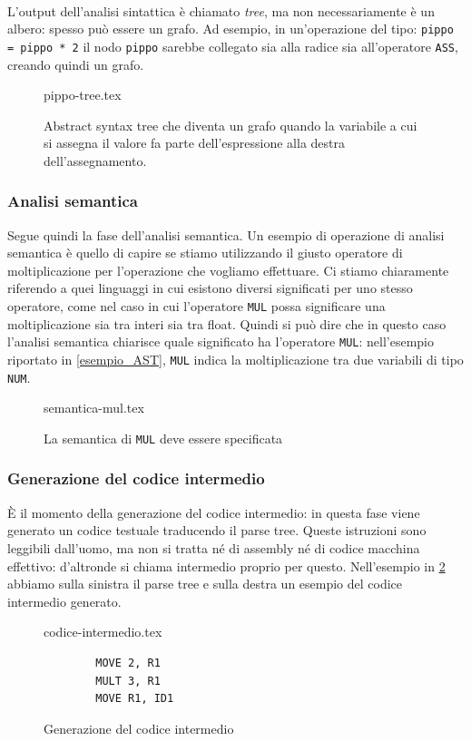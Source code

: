 \documentclass[class=book, crop=false, oneside, 12pt]{standalone}
\begin{document}
\paragraph{}
L’output dell’analisi sintattica è chiamato \emph{tree}, ma non necessariamente è un albero: spesso può essere un grafo. Ad esempio, in un’operazione del tipo:
\texttt{pippo = pippo * 2}
il nodo \texttt{pippo} sarebbe collegato sia alla radice sia all’operatore \texttt{ASS}, creando quindi un grafo.
\begin{figure}[H]
	\centering
	{pippo-tree.tex}
	\caption{Abstract syntax tree che diventa un grafo quando la variabile a cui si assegna il valore fa parte dell'espressione alla destra dell'assegnamento.}
	\label{esempio_pippo}
\end{figure}

\subsubsection{Analisi semantica}
Segue quindi la fase dell’analisi semantica. Un esempio di operazione di analisi semantica è quello di capire se stiamo utilizzando il giusto operatore di moltiplicazione per l’operazione che vogliamo effettuare. Ci stiamo chiaramente riferendo a quei linguaggi in cui esistono diversi significati per uno stesso operatore, come nel caso in cui l'operatore \texttt{MUL} possa significare una moltiplicazione sia tra interi sia tra float. Quindi si può dire che in questo caso l’analisi semantica chiarisce quale significato ha l’operatore \texttt{MUL}: nell’esempio riportato in \ref{esempio_AST}, \texttt{MUL} indica la moltiplicazione tra due variabili di tipo \texttt{NUM}.
\begin{figure}[H]
	\centering
	{semantica-mul.tex}
	\caption{La semantica di \texttt{MUL} deve essere specificata}
\end{figure}

\subsubsection{Generazione del codice intermedio}
È il momento della generazione del codice intermedio: in questa fase viene generato un codice testuale traducendo il parse tree. Queste istruzioni sono leggibili dall’uomo, ma non si tratta né di assembly né di codice macchina effettivo: d'altronde si chiama intermedio proprio per questo. Nell'esempio in \ref{codice_intermedio} abbiamo sulla sinistra il parse tree e sulla destra un esempio del codice intermedio generato.
\begin{figure}[H]
    \begin{minipage}{.5\textwidth}
		\raggedleft
		{codice-intermedio.tex}
	\end{minipage}
	\begin{minipage}{.5\textwidth}
		\raggedright
		\begin{verbatim}
		MOVE 2, R1
		MULT 3, R1
		MOVE R1, ID1
		\end{verbatim}
	\end{minipage}
	\caption{Generazione del codice intermedio}
	\label{codice_intermedio}
\end{figure}
\end{document}
